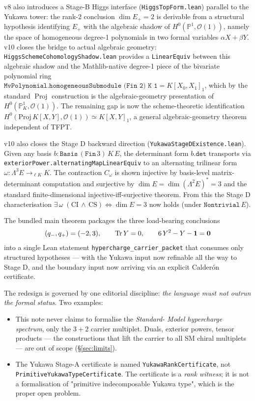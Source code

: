 \documentclass[11pt,a4paper]{article}
\begin{document}
v8 also introduces a Stage-B Higgs interface
(\texttt{HiggsTopForm.lean}) parallel to the Yukawa tower:
the rank-2 conclusion $\dim E_+ = 2$ is derivable from a
structural hypothesis identifying $E_+$ with the algebraic
shadow of $H^0(\mathbb P^1, \mathcal O(1))$, namely the space
of homogeneous degree-1 polynomials in two formal variables
$\alpha X + \beta Y$. v10 closes the bridge to actual algebraic
geometry: \texttt{HiggsSchemeCohomologyShadow.lean} provides a
\texttt{LinearEquiv} between this algebraic shadow and the
Mathlib-native degree-1 piece of the bivariate polynomial ring
$\texttt{MvPolynomial.homogeneousSubmodule (Fin 2) K 1}
= K[X_0, X_1]_1$, which by the standard $\operatorname{Proj}$
construction is the algebraic-geometry presentation of
$H^0(\mathbb P^1_K, \mathcal O(1))$. The remaining gap is now
the scheme-theoretic identification
$H^0(\mathrm{Proj}\,K[X, Y], \mathcal O(1)) \simeq K[X, Y]_1$,
a general algebraic-geometry theorem independent of TFPT.

v10 also closes the Stage D backward direction
(\texttt{YukawaStageDExistence.lean}). Given any basis
$b : \texttt{Basis}\,(\texttt{Fin}\,3)\,K\,E$, the determinant
form $b.\texttt{det}$ transports via
\texttt{exteriorPower.alternatingMapLinearEquiv} to an
alternating trilinear form $\omega : \Lambda^3 E \to_{\ell K} K$.
The contraction $C_\omega$ is shown injective by basis-level
matrix-determinant computation and surjective by
$\dim E = \dim(\Lambda^2 E)^* = 3$ and the standard
finite-dimensional injective-iff-surjective theorem. From this
the Stage D characterisation
$\exists\,\omega\;(\textrm{CI}\,\wedge\,\textrm{CS})
  \iff \dim E = 3$ now holds (under $\texttt{Nontrivial}\,E$).

The bundled main theorem packages the three load-bearing
conclusions
\[
(q_-,q_+)=(-2,3), \qquad \operatorname{Tr} Y=0, \qquad 6\,Y^2 - Y - \mathbf 1 = \mathbf 0
\]
into a single Lean statement \texttt{hypercharge\_carrier\_packet}
that consumes only structured hypotheses --- with the Yukawa
input now refinable all the way to Stage D, and the boundary
input now arriving via an explicit Calder\'on certificate.

The redesign is governed by one editorial discipline: \emph{the
language must not outrun the formal status}. Two examples:

\begin{itemize}[leftmargin=1.6em, itemsep=2pt]
\item This note never claims to formalise the \emph{Standard-
    Model hypercharge spectrum}, only the $3+2$ carrier
    multiplet. Duals, exterior powers, tensor products --- the
    constructions that lift the carrier to all SM chiral
    multiplets --- are out of scope (\S\ref{sec:limits}).
\item The Yukawa Stage-A certificate is named
    \texttt{YukawaRankCertificate}, not
    \texttt{PrimitiveYukawaTypeCertificate}. The certificate is
    a \emph{rank witness}; it is not a formalisation of
    "primitive indecomposable Yukawa type", which is the proper
    open problem.
\end{itemize}
\end{document}
